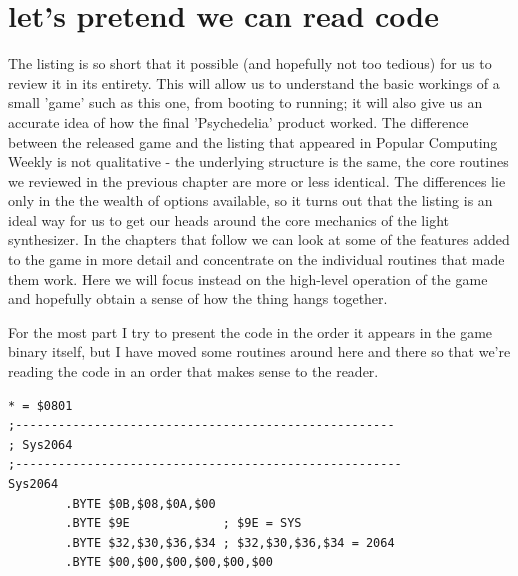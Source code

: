 \chapter{let's pretend we can read code} 
\label{sec:commentary}
\rhead[]{\leftmark}
\lstset{style=6502Style}
The listing is so short that it possible (and hopefully not too tedious) for us to
review it in its entirety. This will allow us to understand the basic workings of 
a small 'game' such as this one, from booting to running; it will also give us an
accurate idea of how the final 'Psychedelia' product worked. The difference between
the released game and the listing that appeared in Popular Computing Weekly is not
qualitative - the underlying structure is the same, the core routines we reviewed 
in the previous chapter are more or less identical. The differences lie only in the
the wealth of options available, so it turns out that the listing is an ideal way
for us to get our heads around the core mechanics of the light synthesizer. In the
chapters that follow we can look at some of the features added to the game in more
detail and concentrate on the individual routines that made them work. Here we will
focus instead on the high-level operation of the game and hopefully obtain a sense
of how the thing hangs together.

For the most part I try to present the code in the order it appears in the game
binary itself, but I have moved some routines around here and there so that we're
reading the code in an order that makes sense to the reader.

\clearpage
\begin{lstlisting}[caption=The bootstrap routine common to nearly every C64 program]
* = $0801
;-----------------------------------------------------
; Sys2064
;------------------------------------------------------
Sys2064
        .BYTE $0B,$08,$0A,$00
        .BYTE $9E             ; $9E = SYS
        .BYTE $32,$30,$36,$34 ; $32,$30,$36,$34 = 2064
        .BYTE $00,$00,$00,$00,$00,$00
\end{lstlisting}

